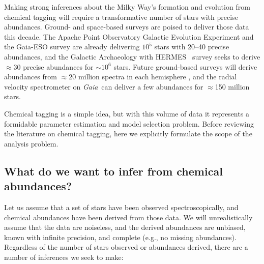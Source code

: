 \documentclass{aastex61}
\newcommand{\acronym}[1]{{\small{#1}}}
\newcommand{\project}[1]{\textsl{#1}}
\newcommand{\apogee}{\acronym{APOGEE}}
\newcommand{\ges}{\acronym{GES}}
\newcommand{\hermes}{\acronym{HERMES}}
\newcommand{\galah}{\acronym{GALAH}}
\newcommand{\fourmost}{\acronym{4MOST}}
\newcommand{\weave}{\acronym{WEAVE}}
\newcommand{\gaia}{\project{Gaia}}
\begin{document}





Making strong inferences about the Milky Way's formation and evolution from
chemical tagging will require a transformative number of stars with precise
abundances.
Ground- and space-based surveys are poised to deliver those data this decade. 
The Apache Point Observatory Galactic Evolution Experiment 
\citep[\apogee, e.g.,][]{apogee} and the Gaia-ESO survey 
\citep[\ges;][]{Gilmore_2012,Randich_2013} are already delivering $10^5$ stars 
with 20--40 precise abundances, and the Galactic Archaeology with \hermes\ 
\citep[\galah;][]{DeSilva_2015} survey seeks to derive $\approx$30 precise 
abundances for $\sim10^6$ stars. 
Future ground-based surveys will derive abundances from $\approx$20 million 
spectra in each hemisphere \citep[e.g., \weave, \fourmost;][]{weave,4most},
and the radial velocity spectrometer on \gaia\ can deliver a few abundances 
for $\approx$150 million stars.


Chemical tagging is a simple idea, but with this volume of data it represents
a formidable parameter estimation and model selection problem.
Before reviewing the literature on chemical tagging, here we explicitly
formulate the scope of the analysis problem.


\subsection{What do we want to infer from chemical abundances?}
\label{section:the-problem}

Let us assume that a set of stars have been observed spectroscopically, and
chemical abundances have been derived from those data.
We will unrealistically assume that the data are noiseless, and the derived
abundances are unbiased, known with infinite precision, and complete (e.g., no 
missing abundances).
Regardless of the number of stars observed or abundances derived, there are a
number of inferences we seek to make:
\end{document}
